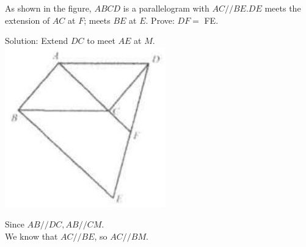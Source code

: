 \documentclass{article}
\begin{document}
As shown in the figure, \(A B C D\) is a parallelogram with \(A C / / B E . D E\) meets the extension of \(A C\) at \(F\); meets \(B E\) at \(E\). Prove: \(D F=\) FE.

Solution:
Extend \(D C\) to meet \(A E\) at \(M\).\\
\centering
\includegraphics[width=\textwidth]{images/037.jpg}

Since \(A B / / D C, A B / / C M\).\\
We know that \(A C / / B E\), so \(A C / / B M\).
\end{document}
